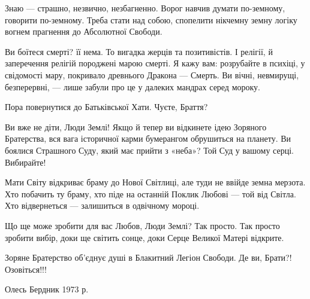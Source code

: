 Знаю — страшно, незвично, незбагненно. Ворог навчив думати по-земному, говорити
по-земному. Треба стати над собою, спопелити нікчемну земну логіку вогнем
прагнення до Абсолютної Свободи.

Ви боїтеся смерті? її нема. То вигадка жерців та позитивістів. І релігії, й
заперечення релігій породжені марою смерті. Я кажу вам: розрубайте в психіці, у
свідомості мару, покривало древнього Дракона — Смерть. Ви вічні, невмирущі,
безперервні, — лише забули про це у далеких мандрах серед мороку.

Пора повернутися до Батьківської Хати. Чуєте, Браття?

Ви вже не діти, Люди Землі! Якщо й тепер ви відкинете ідею Зоряного Братерства,
вся вага історичної карми бумерангом обрушиться на планету. Ви боялися
Страшного Суду, який має прийти з «неба»? Той Суд у вашому серці. Вибирайте!

Мати Світу відкриває браму до Нової Світлиці, але туди не ввійде земна мерзота.
Хто побачить ту браму, хто піде на останній Поклик Любові — той від Світла. Хто
відвернеться — залишиться в одвічному мороці.

Що ще може зробити для вас Любов, Люди Землі? Так просто. Так просто зробити
вибір, доки ще світить сонце, доки Серце Великої Матері відкрите.

Зоряне Братерство об’єднує душі в Блакитний Легіон Свободи. Де ви, Брати?!
Озовіться!!!

Олесь Бердник 1973 р.

